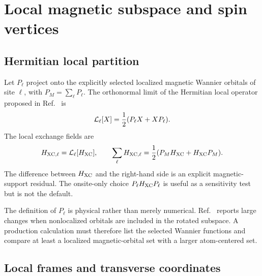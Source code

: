 \section{Local magnetic subspace and spin vertices}
\label{sec:local-torque}

\subsection{Hermitian local partition}

Let $P_\ell$ project onto the explicitly selected localized magnetic Wannier orbitals of site $\ell$, with $P_M=\sum_\ell P_\ell$. The orthonormal limit of the Hermitian local operator proposed in Ref.~\cite{MartinezCarracedo2023} is
\begin{equation}
\mathcal L_\ell[X]=\frac{1}{2}(P_\ell X+XP_\ell).
\label{eq:local-partition}
\end{equation}
The local exchange fields are
\begin{equation}
H_{\mathrm{XC},\ell}=\mathcal L_\ell[H_{\mathrm{XC}}],
\qquad
\sum_\ell H_{\mathrm{XC},\ell}
=\frac12(P_MH_{\mathrm{XC}}+H_{\mathrm{XC}}P_M).
\label{eq:local-xc}
\end{equation}
The difference between $H_{\mathrm{XC}}$ and the right-hand side is an explicit magnetic-support residual. The onsite-only choice $P_\ell H_{\mathrm{XC}}P_\ell$ is useful as a sensitivity test but is not the default.

The definition of $P_\ell$ is physical rather than merely numerical. Ref.~\cite{MartinezCarracedo2023} reports large changes when nonlocalized orbitals are included in the rotated subspace. A production calculation must therefore list the selected Wannier functions and compare at least a localized magnetic-orbital set with a larger atom-centered set.

\subsection{Local frames and transverse coordinates}

